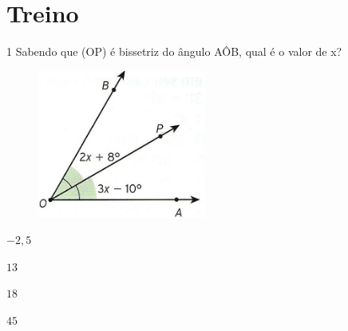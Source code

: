 
\section{Treino}

\num{1}  Sabendo que (OP) é bissetriz do ângulo AÔB, qual é o valor de x?

\begin{figure}
\includegraphics[width=2.17708in,height=1.91619in]{./imgSAEB_6_MAT/media/image62.jpeg}
\end{figure}

\begin{escolha}
\item $-2,5$
\item $13$
\item $18$
\item $45$
\end{escolha}



